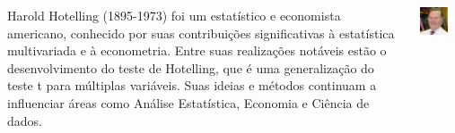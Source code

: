 \documentclass[12pt]{beamer}
\begin{document}
\begin{frame}{}
	\begin{block}{}
		\begin{columns} %
			
			\begin{column}{0.6\textwidth} %
				\vfill
				\centering
				\justifying
				Harold Hotelling (1895-1973) foi um estatístico e economista americano, conhecido por suas contribuições significativas à estatística multivariada e à econometria. Entre suas realizações notáveis estão o desenvolvimento do teste de Hotelling, que é uma generalização do teste t para múltiplas variáveis. Suas ideias e métodos continuam a influenciar áreas como Análise Estatística, Economia e Ciência de dados.
			\end{column}
			
			\begin{column}{0.3\textwidth} %
				\includegraphics[width=0.7\textwidth]{figs/Hotelling.jpg} %
			\end{column}
			
		\end{columns}
	\end{block}
\end{frame}
\end{document}
